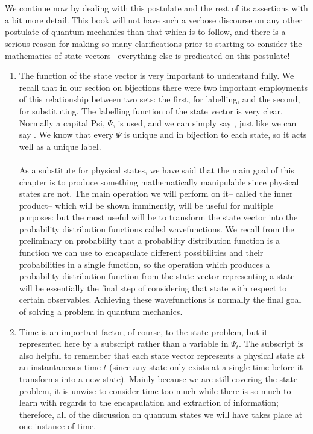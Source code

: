 \\\\
We continue now by dealing with this postulate and the rest of its assertions with a bit more detail. This book will not have such a verbose discourse on any other postulate of quantum mechanics than that which is to follow, and there is a serious reason for making so many clarifications prior to starting to consider the mathematics of state vectors-- everything else is predicated on this postulate!
\begin{enumerate}
    \item The function of the state vector is very important to understand fully. We recall that in our section on bijections there were two important employments of this relationship between two sets: the first, for labelling, and the second, for substituting. The labelling function of the state vector is very clear. Normally a capital Psi, $\Psi$, is used, and we can simply say , just like we can say . We know that every $\Psi$ is unique and in bijection to each state, so it acts well as a unique label.
    \\\\
    As a substitute for physical states, we have said that the main goal of this chapter is to produce something mathematically manipulable since physical states are not. The main operation we will perform on it-- called the inner product-- which will be shown imminently, will be useful for multiple purposes: but the most useful will be to transform the state vector into the probability distribution functions called wavefunctions. We recall from the preliminary on probability that a probability distribution function is a function we can use to encapsulate different possibilities and their probabilities in a single function, so the operation which produces a probability distribution function from the state vector representing a state will be essentially the final step of considering that state with respect to certain observables. Achieving these wavefunctions is normally the final goal of solving a problem in quantum mechanics.
    \item Time is an important factor, of course, to the state problem, but it represented here by a subscript rather than a variable in $\Psi_{t}$. The subscript is also helpful to remember that each state vector represents a physical state at an instantaneous time $t$ (since any state only exists at a single time before it transforms into a new state). Mainly because we are still covering the state problem, it is unwise to consider time too much while there is so much to learn with regards to the encapsulation and extraction of information; therefore, all of the discussion on quantum states we will have takes place at one instance of time.

\end{enumerate}
